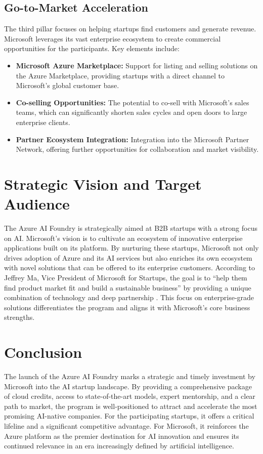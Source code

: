 \documentclass[11pt, a4paper]{article}
\begin{document}
\subsection{Go-to-Market Acceleration}
The third pillar focuses on helping startups find customers and generate revenue. Microsoft leverages its vast enterprise ecosystem to create commercial opportunities for the participants. Key elements include:
\begin{itemize}
    \item \textbf{Microsoft Azure Marketplace:} Support for listing and selling solutions on the Azure Marketplace, providing startups with a direct channel to Microsoft's global customer base.
    \item \textbf{Co-selling Opportunities:} The potential to co-sell with Microsoft's sales teams, which can significantly shorten sales cycles and open doors to large enterprise clients.
    \item \textbf{Partner Ecosystem Integration:} Integration into the Microsoft Partner Network, offering further opportunities for collaboration and market visibility.
\end{itemize}

\section{Strategic Vision and Target Audience}
The Azure AI Foundry is strategically aimed at B2B startups with a strong focus on AI. Microsoft's vision is to cultivate an ecosystem of innovative enterprise applications built on its platform. By nurturing these startups, Microsoft not only drives adoption of Azure and its AI services but also enriches its own ecosystem with novel solutions that can be offered to its enterprise customers. According to Jeffrey Ma, Vice President of Microsoft for Startups, the goal is to ``help them find product market fit and build a sustainable business'' by providing a unique combination of technology and deep partnership \cite{microsoft_blog}. This focus on enterprise-grade solutions differentiates the program and aligns it with Microsoft's core business strengths.

\section{Conclusion}
The launch of the Azure AI Foundry marks a strategic and timely investment by Microsoft into the AI startup landscape. By providing a comprehensive package of cloud credits, access to state-of-the-art models, expert mentorship, and a clear path to market, the program is well-positioned to attract and accelerate the most promising AI-native companies. For the participating startups, it offers a critical lifeline and a significant competitive advantage. For Microsoft, it reinforces the Azure platform as the premier destination for AI innovation and ensures its continued relevance in an era increasingly defined by artificial intelligence.
\end{document}
